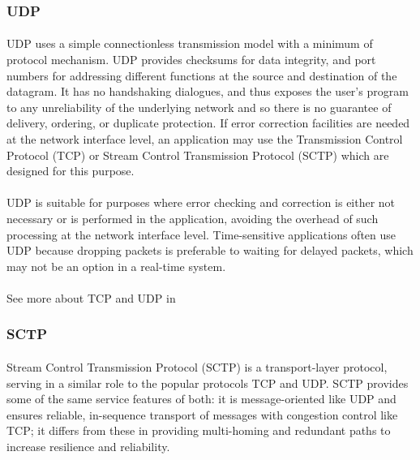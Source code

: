 \subsubsection{UDP}
\paragraph{}
UDP uses a simple connectionless transmission model with a minimum of protocol mechanism. UDP provides checksums for data integrity, and port numbers for addressing different functions at the source and destination of the datagram. It has no handshaking dialogues, and thus exposes the user's program to any unreliability of the underlying network and so there is no guarantee of delivery, ordering, or duplicate protection. If error correction facilities are needed at the network interface level, an application may use the Transmission Control Protocol (TCP) or Stream Control Transmission Protocol (SCTP) which are designed for this purpose.
\paragraph{}
UDP is suitable for purposes where error checking and correction is either not necessary or is performed in the application, avoiding the overhead of such processing at the network interface level. Time-sensitive applications often use UDP because dropping packets is preferable to waiting for delayed packets, which may not be an option in a real-time system.
\paragraph{}
See more about TCP and UDP in \cite{IP_TCP_UDP}

\subsubsection{SCTP}
\paragraph{}
Stream Control Transmission Protocol (SCTP) is a transport-layer protocol, serving in a similar role to the popular protocols TCP and UDP. SCTP provides some of the same service features of both: it is message-oriented like UDP and ensures reliable, in-sequence transport of messages with congestion control like TCP; it differs from these in providing multi-homing and redundant paths to increase resilience and reliability.
